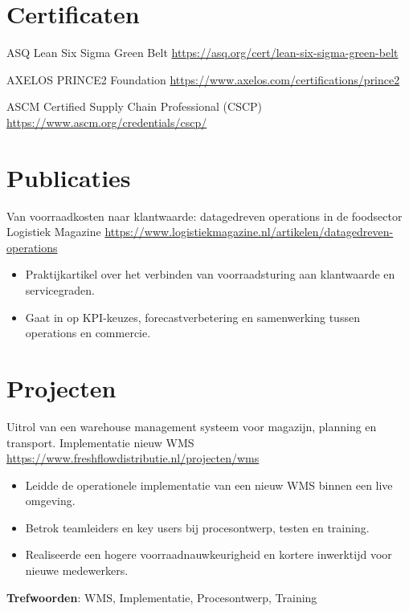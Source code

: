 \documentclass[a4paper, serif, 10pt]{moderncv}
\begin{document}
\section{Certificaten}

        {ASQ}
        {Lean Six Sigma Green Belt}
        {\url{https://asq.org/cert/lean-six-sigma-green-belt}}
        {}
        {}

        {AXELOS}
        {PRINCE2 Foundation}
        {\url{https://www.axelos.com/certifications/prince2}}
        {}
        {}

        {ASCM}
        {Certified Supply Chain Professional (CSCP)}
        {\url{https://www.ascm.org/credentials/cscp/}}
        {}
        {}
\section{Publicaties}

        {Van voorraadkosten naar klantwaarde: datagedreven operations in de foodsector}
        {Logistiek Magazine}
        {\url{https://www.logistiekmagazine.nl/artikelen/datagedreven-operations}}
        {}
        {\begin{itemize}
\item Praktijkartikel over het verbinden van voorraadsturing aan klantwaarde en servicegraden.
\item Gaat in op KPI-keuzes, forecastverbetering en samenwerking tussen operations en commercie.
\end{itemize}}
\section{Projecten}

        {Uitrol van een warehouse management systeem voor magazijn, planning en transport.}
        {Implementatie nieuw WMS}
        {\url{https://www.freshflowdistributie.nl/projecten/wms}}
        {}
        {\begin{itemize}
\item Leidde de operationele implementatie van een nieuw WMS binnen een live omgeving.
\item Betrok teamleiders en key users bij procesontwerp, testen en training.
\item Realiseerde een hogere voorraadnauwkeurigheid en kortere inwerktijd voor nieuwe medewerkers.
\end{itemize}
\textbf{Trefwoorden}: WMS, Implementatie, Procesontwerp, Training}
\end{document}
